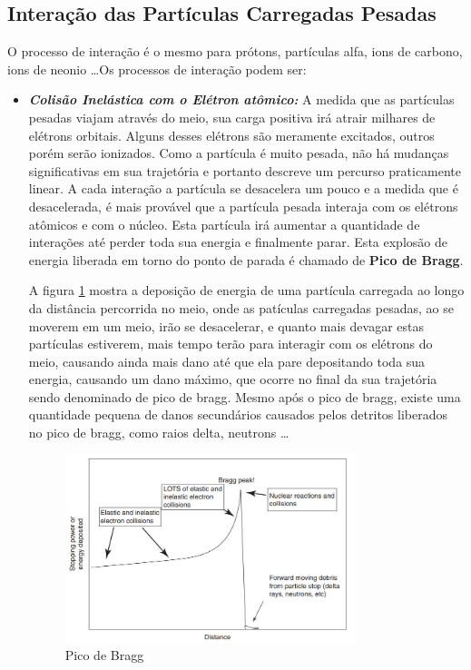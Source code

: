 \documentclass[11pt,a4paper]{article}
\begin{document}
        \subsection{Interação das Partículas Carregadas Pesadas}

            O processo de interação é o mesmo para prótons, partículas alfa, ions de carbono, ions de neonio \dots Os processos de interação podem ser:

            \begin{itemize}
                \item \textbf{\textit{\textcolor{CarnationPink}{Colisão Inelástica com o Elétron atômico}:}} A medida que as partículas pesadas viajam através do meio, sua carga positiva irá atrair milhares de elétrons orbitais. Alguns desses elétrons são meramente excitados, outros porém serão ionizados. Como a partícula é muito pesada, não há mudanças significativas em sua trajetória e portanto descreve um percurso praticamente linear. A cada interação a partícula se desacelera um pouco e a medida que é desacelerada, é mais provável que a partícula pesada interaja com os elétrons atômicos e com o núcleo. Esta partícula irá aumentar a quantidade de interações até perder toda sua energia e finalmente parar. Esta explosão de energia liberada em torno do ponto de parada é chamado de \textbf{\textcolor{CarnationPink}{Pico de Bragg}}.
                
                A figura \ref{fig:picodeBragg} mostra a deposição de energia de uma partícula carregada ao longo da distância percorrida no meio, onde as patículas carregadas pesadas, ao se moverem em um meio, irão se desacelerar, e quanto mais devagar estas partículas estiverem, mais tempo terão para interagir com os elétrons do meio, causando ainda mais dano até que ela pare depositando toda sua energia, causando um dano máximo, que ocorre no final da sua trajetória sendo denominado de pico de bragg. Mesmo após o pico de bragg, existe uma quantidade pequena de danos secundários causados pelos detritos liberados no pico de bragg, como raios delta, neutrons \dots
                
                \begin{figure}[h]
                    \centering
                    \includegraphics[width=0.8\textwidth]{Imagens/picodeBragg.JPG}
                    \caption{Pico de Bragg}
                    \label{fig:picodeBragg}                
                \end{figure}
                


\end{itemize}
\end{document}

